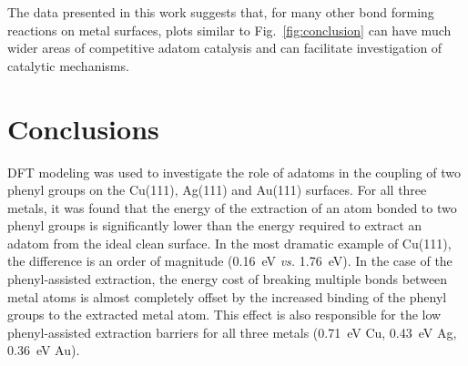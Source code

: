 \documentclass[journal=jacsat,manuscript=article]{achemso}
\newcommand{\comm}{\color{ForestGreen}} %
\begin{document}
The data presented in this work suggests that, for many other bond forming reactions on metal surfaces, plots similar to Fig.~\ref{fig:conclusion} can have much wider areas of competitive adatom catalysis and can facilitate investigation of catalytic mechanisms. 



\section{Conclusions}

DFT modeling was used to investigate the role of adatoms in the coupling of two phenyl groups on the Cu(111), Ag(111) and Au(111) surfaces. For all three metals, it was found that the energy of the extraction of an atom bonded to two phenyl groups is significantly lower than the energy required to extract an adatom from the ideal clean surface. In the most dramatic example of Cu(111), the difference is an order of magnitude (\SI{0.16}{\electronvolt} \emph{vs.} \SI{1.76}{\electronvolt}). In the case of the phenyl-assisted extraction, the energy cost of breaking multiple bonds between metal atoms is almost completely offset by the increased binding of the phenyl groups to the extracted metal atom. This effect is also responsible for the low phenyl-assisted extraction barriers for all three metals (\SI{0.71}{\electronvolt} Cu, \SI{0.43}{\electronvolt} Ag, \SI{0.36}{\electronvolt} Au). 
\end{document}
